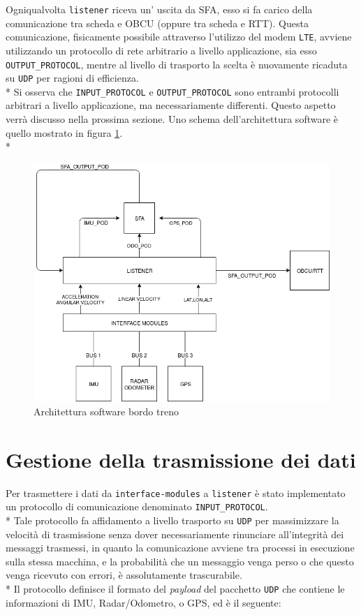 Ogniqualvolta \texttt{listener} riceva un' uscita da SFA, esso si fa carico della comunicazione tra scheda e OBCU (oppure tra scheda e RTT). Questa comunicazione, fisicamente possibile attraverso l'utilizzo del modem \texttt{LTE}, avviene utilizzando un protocollo di rete arbitrario a livello applicazione, sia esso \texttt{OUTPUT\_PROTOCOL}, mentre al livello di trasporto la scelta \`e nuovamente ricaduta su \texttt{UDP} per ragioni di efficienza.\\*
Si osserva che \texttt{INPUT\_PROTOCOL} e \texttt{OUTPUT\_PROTOCOL} sono entrambi protocolli arbitrari a livello applicazione, ma necessariamente differenti. Questo aspetto verr\`a discusso nella prossima sezione. Uno schema dell'architettura software \`e quello mostrato in figura \ref{fig:tdiagramint}.\\*
\begin{figure}[h]
	\centering
	\includegraphics[width=\linewidth]{img/InternalTrainSchema}
	\caption{Architettura software bordo treno}
	\label{fig:tdiagramint}
\end{figure}
\section{Gestione della trasmissione dei dati}
Per trasmettere i dati da \texttt{interface-modules} a \texttt{listener} \`e stato implementato un protocollo di comunicazione denominato \texttt{INPUT\_PROTOCOL}.\\*
Tale protocollo fa affidamento a livello trasporto su \texttt{UDP} per massimizzare la velocit\`a di trasmissione senza dover necessariamente rinunciare all'integrit\`a dei messaggi trasmessi, in quanto la comunicazione avviene tra processi in esecuzione sulla stessa macchina, e la probabilit\`a che un messaggio venga perso o che questo venga ricevuto con errori, \`e assolutamente trascurabile.\\*
Il protocollo definisce il formato del \emph{payload} del pacchetto \texttt{UDP} che contiene le informazioni di IMU, Radar/Odometro, o GPS, ed \`e il seguente:



